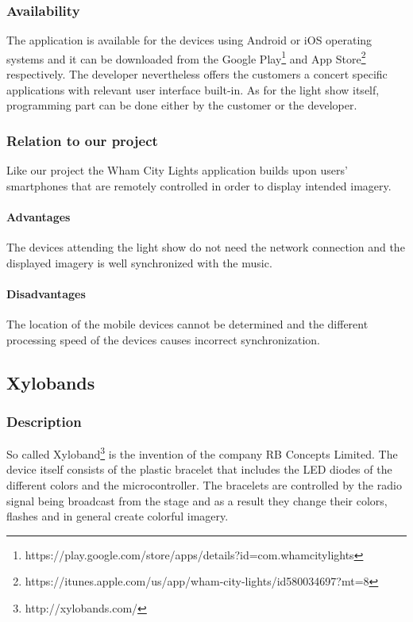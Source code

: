 \subsubsection{Availability}
The application is available for the devices using Android or iOS operating systems and it can be downloaded from the Google Play\footnote{https://play.google.com/store/apps/details?id=com.whamcitylights} and App Store\footnote{https://itunes.apple.com/us/app/wham-city-lights/id580034697?mt=8} respectively. The developer nevertheless offers the customers a concert specific applications with relevant user interface built-in. As for the light show itself, programming part can be done either by the customer or the developer.

\subsubsection{Relation to our project}
Like our project the Wham City Lights application builds upon users' smartphones that are remotely controlled in order to display intended imagery. 

\paragraph{Advantages}
The devices attending the light show do not need the network connection and the displayed imagery is well synchronized with the music.

\paragraph{Disadvantages}
The location of the mobile devices cannot be determined and the different processing speed of the devices causes incorrect synchronization.


\subsection{Xylobands}

\subsubsection{Description}
So called Xyloband\footnote{http://xylobands.com/} is the invention of the company RB Concepts Limited. The device itself consists of the plastic bracelet that includes the LED diodes of the different colors and the microcontroller. 
The bracelets are controlled by the radio signal being broadcast from the stage and as a result they change their colors, flashes and in general create colorful imagery.

